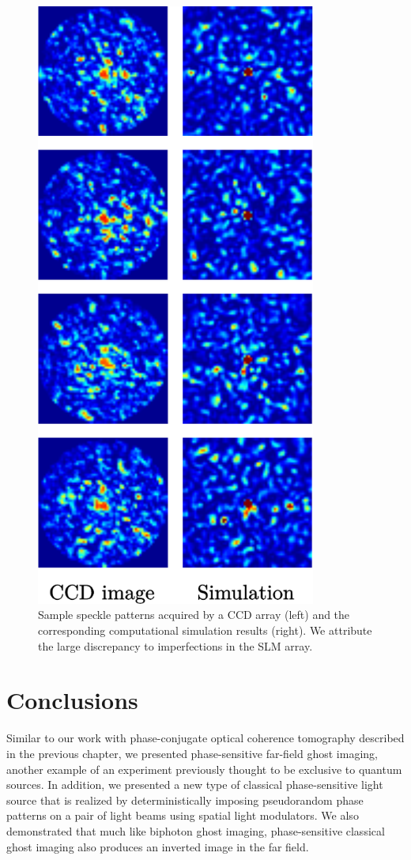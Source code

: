 \begin{figure}[h]
\begin{center}
\includegraphics[height=20cm]{figure-ghost-slm-samples.pdf}
\caption{Sample speckle patterns acquired by a CCD array (left) and the corresponding computational simulation results (right). We attribute the large discrepancy to imperfections in the SLM array.}
\label{figure:ghost-slm-samples}
\end{center}
\end{figure}

\section{Conclusions}

Similar to our work with phase-conjugate optical coherence tomography described in the previous chapter, we presented phase-sensitive far-field ghost imaging, another example of an experiment previously thought to be exclusive to quantum sources. In addition, we presented a new type of classical phase-sensitive light source that is realized by deterministically imposing pseudorandom phase patterns on a pair of light beams using spatial light modulators. We also demonstrated that much like biphoton ghost imaging, phase-sensitive classical ghost imaging also produces an inverted image in the far field.

